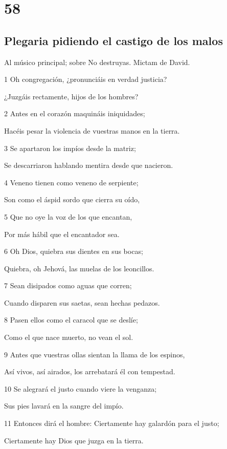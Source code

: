 \chapter{58}

\section*{Plegaria pidiendo el castigo de los malos}

\par Al músico principal; sobre No destruyas. Mictam de David.

\par 1 Oh congregación, ¿pronunciáis en verdad justicia?
\par ¿Juzgáis rectamente, hijos de los hombres?
\par 2 Antes en el corazón maquináis iniquidades;
\par Hacéis pesar la violencia de vuestras manos en la tierra.
\par 3 Se apartaron los impíos desde la matriz;
\par Se descarriaron hablando mentira desde que nacieron.
\par 4 Veneno tienen como veneno de serpiente;
\par Son como el áspid sordo que cierra su oído,
\par 5 Que no oye la voz de los que encantan,
\par Por más hábil que el encantador sea.
\par 6 Oh Dios, quiebra sus dientes en sus bocas;
\par Quiebra, oh Jehová, las muelas de los leoncillos.
\par 7 Sean disipados como aguas que corren;
\par Cuando disparen sus saetas, sean hechas pedazos.
\par 8 Pasen ellos como el caracol que se deslíe;
\par Como el que nace muerto, no vean el sol.
\par 9 Antes que vuestras ollas sientan la llama de los espinos,
\par Así vivos, así airados, los arrebatará él con tempestad.
\par 10 Se alegrará el justo cuando viere la venganza;
\par Sus pies lavará en la sangre del impío.
\par 11 Entonces dirá el hombre: Ciertamente hay galardón para el justo;
\par Ciertamente hay Dios que juzga en la tierra.

